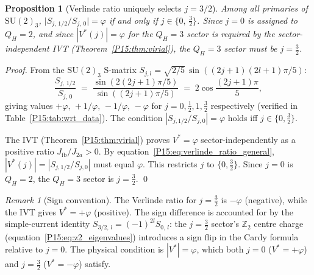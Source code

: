 \documentclass[11pt,a4paper]{article}
\newtheorem{proposition}[theorem]{Proposition}
\theoremstyle{definition}\newtheorem{definition}[theorem]{Definition}
\theoremstyle{remark}
\newtheorem{remark}[theorem]{Remark}
\newcommand{\vp}{\varphi}
\newcommand{\QH}{Q_H}
\begin{document}
\begin{proposition}[Verlinde ratio uniquely selects $j=3/2$]
\label{P15:prop:verlinde_unique}
Among all primaries of $\mathrm{SU}(2)_3$,
$\bigl|S_{j,\,1/2}/S_{j,\,0}\bigr|=\vp$ if and only if
$j\in\{0,\,\frac32\}$.
Since $j=0$ is assigned to $\QH=2$, and since
$|V^*(j)|=\vp$ for the $\QH=3$ sector is required by the
sector-independent IVT (Theorem~\ref{P15:thm:virial}),
the $\QH=3$ sector must be $j=\frac32$.
\end{proposition}

\begin{proof}
From the $\mathrm{SU}(2)_3$ S-matrix
$S_{j,l}=\sqrt{2/5}\,\sin((2j{+}1)(2l{+}1)\pi/5)$:
\begin{equation}
  \frac{S_{j,\,1/2}}{S_{j,\,0}}
  \;=\; \frac{\sin(2(2j{+}1)\pi/5)}{\sin((2j{+}1)\pi/5)}
  \;=\; 2\cos\!\frac{(2j{+}1)\pi}{5},
  \label{P15:eq:ratio_formula}
\end{equation}
giving values $+\vp,\,+1/\vp,\,-1/\vp,\,-\vp$
for $j=0,\tfrac12,1,\tfrac32$ respectively
(verified in Table~\ref{P15:tab:wrt_data}).
The condition $|S_{j,1/2}/S_{j,0}|=\vp$ holds iff
$j\in\{0,\frac32\}$.

The IVT (Theorem~\ref{P15:thm:virial}) proves $V^*=\vp$
sector-independently as a positive ratio $J_{\mathrm{fb}}/J_{2a}>0$.
By equation~\eqref{P15:eq:verlinde_ratio_general},
$|V^*(j)|=|S_{j,1/2}/S_{j,0}|$ must equal $\vp$.
This restricts $j$ to $\{0,\frac32\}$.
Since $j=0$ is $\QH=2$, the $\QH=3$ sector is $j=\frac32$.
\qed
\end{proof}

\begin{remark}[Sign convention]
\label{P15:rem:sign_convention}
The Verlinde ratio for $j=\frac32$ is $-\vp$ (negative),
while the IVT gives $V^*=+\vp$ (positive).
The sign difference is accounted for by the simple-current
identity $S_{3/2,\,l}=(-1)^{2l}S_{0,\,l}$: the $j=\frac32$
sector's $\mathbb{Z}_2$ centre charge (equation~\eqref{P15:eq:z2_eigenvalues})
introduces a sign flip in the Cardy formula relative to $j=0$.
The physical condition is $|V^*|=\vp$, which both
$j=0$ ($V^*=+\vp$) and $j=\frac32$ ($V^*=-\vp$) satisfy.
\end{remark}
\end{document}
